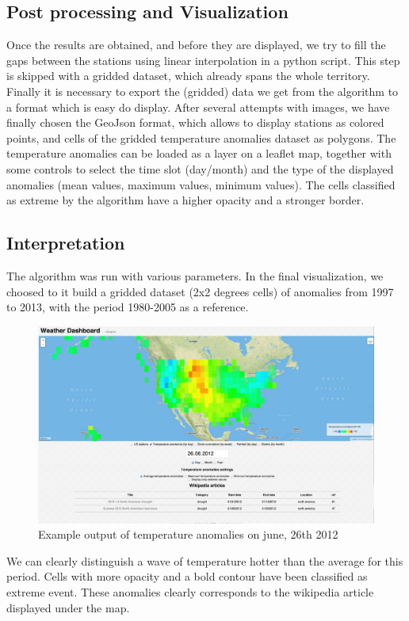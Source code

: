 \subsection{Post processing and Visualization}

Once the results are obtained, and before they are displayed, we try to fill the gaps between the stations using linear interpolation in a python script. This step is skipped with a gridded dataset, which already spans the whole territory.
Finally it is necessary to export the (gridded) data we get from the algorithm to a format which is easy do display. After several attempts with images, we have finally chosen the GeoJson format, which allows to display stations as colored points, and cells of the gridded temperature anomalies dataset as polygons.
The temperature anomalies can be loaded as a layer on a leaflet map, together with some controls to select the time slot (day/month) and the type of the displayed anomalies (mean values, maximum values, minimum values).
The cells classified as extreme by the algorithm have a higher opacity and a stronger border.

\subsection{Interpretation}
The algorithm was run with various parameters. In the final visualization, we choosed to it build a gridded dataset (2x2 degrees cells) of anomalies from 1997 to 2013, with the period 1980-2005 as a reference.
\begin{figure}[h]
   \includegraphics[scale=0.3]{figures/temperature}
   \caption{Example output of temperature anomalies on june, 26th 2012}
\end{figure}

We can clearly distinguish a wave of temperature hotter than the average for this period. Cells with more opacity and a bold contour have been classified as extreme event.
These anomalies clearly corresponds to the wikipedia article displayed under the map.
